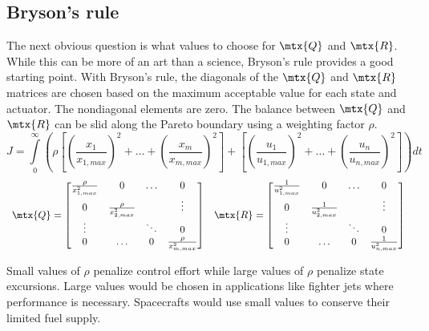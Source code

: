 \subsection{Bryson's rule}

The next obvious question is what values to choose for $\mtx{Q}$ and $\mtx{R}$.
While this can be more of an art than a science, Bryson's rule provides a good
starting point. With Bryson's rule, the diagonals of the $\mtx{Q}$ and $\mtx{R}$
matrices are chosen based on the maximum acceptable value for each \gls{state}
and actuator. The nondiagonal elements are zero. The balance between $\mtx{Q}$
and $\mtx{R}$ can be slid along the Pareto boundary using a weighting factor
$\rho$.
\begin{equation*}
  J = \int\limits_0^\infty \left(\rho \left[
    \left(\frac{x_1}{x_{1,max}}\right)^2 + \ldots +
    \left(\frac{x_m}{x_{m,max}}\right)^2\right] + \left[
    \left(\frac{u_1}{u_{1,max}}\right)^2 + \ldots +
    \left(\frac{u_n}{u_{n,max}}\right)^2\right]\right) dt
\end{equation*}
\begin{equation*}
  \begin{array}{cc}
    \mtx{Q} = \begin{bmatrix}
      \frac{\rho}{x_{1,max}^2} & 0 & \ldots & 0 \\
      0 & \frac{\rho}{x_{2,max}^2} & & \vdots \\
      \vdots & & \ddots & 0 \\
      0 & \ldots & 0 & \frac{\rho}{x_{m,max}^2}
    \end{bmatrix} &
    \mtx{R} = \begin{bmatrix}
      \frac{1}{u_{1,max}^2} & 0 & \ldots & 0 \\
      0 & \frac{1}{u_{2,max}^2} & & \vdots \\
      \vdots & & \ddots & 0 \\
      0 & \ldots & 0 & \frac{1}{u_{n,max}^2}
    \end{bmatrix}
  \end{array}
\end{equation*}

Small values of $\rho$ penalize \gls{control effort} while large values of
$\rho$ penalize \gls{state} excursions. Large values would be chosen in
applications like fighter jets where performance is necessary. Spacecrafts would
use small values to conserve their limited fuel supply.

